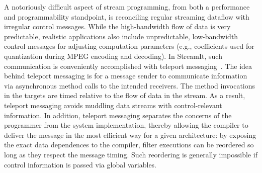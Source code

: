 \label{sec:messaging}
\vspace{-11pt}

A notoriously difficult aspect of stream programming, from both a
performance and programmability standpoint, is reconciling regular
streaming dataflow with irregular control messages.  While the
high-bandwidth flow of data is very predictable, realistic
applications also include unpredictable, low-bandwidth control
messages for adjusting computation parameters (e.g., coefficients used
for quantization during MPEG encoding and decoding).  In StreamIt,
such communication is conveniently accomplished with teleport
messaging~\cite{thies05ppopp}.  The idea behind teleport messaging is
for a message sender to communicate information via asynchronous
method calls to the intended receivers. The method invocations in the
targets are timed relative to the flow of data in the stream. As a
result, teleport messaging avoids muddling data streams with
control-relevant information. In addition, teleport messaging
separates the concerns of the programmer from the system
implementation, thereby allowing the compiler to deliver the message
in the most efficient way for a given architecture: by exposing the
exact data dependences to the compiler, filter executions can be
reordered so long as they respect the message timing. Such reordering
is generally impossible if control information is passed via global
variables.
